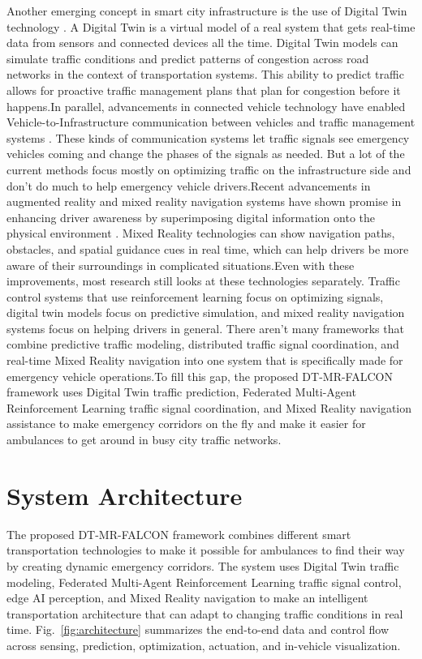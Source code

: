 \documentclass[conference]{IEEEtran}
\begin{document}
Another emerging concept in smart city infrastructure is the use of Digital Twin technology \cite{b13,b14,b15,b16}. A Digital Twin is a virtual model of a real system that gets real-time data from sensors and connected devices all the time. Digital Twin models can simulate traffic conditions and predict patterns of congestion across road networks in the context of transportation systems. This ability to predict traffic allows for proactive traffic management plans that plan for congestion before it happens.In parallel, advancements in connected vehicle technology have enabled Vehicle-to-Infrastructure communication between vehicles and traffic management systems \cite{b25,b26}. These kinds of communication systems let traffic signals see emergency vehicles coming and change the phases of the signals as needed. But a lot of the current methods focus mostly on optimizing traffic on the infrastructure side and don't do much to help emergency vehicle drivers.Recent advancements in augmented reality and mixed reality navigation systems have shown promise in enhancing driver awareness by superimposing digital information onto the physical environment \cite{b27,b28}. Mixed Reality technologies can show navigation paths, obstacles, and spatial guidance cues in real time, which can help drivers be more aware of their surroundings in complicated situations.Even with these improvements, most research still looks at these technologies separately. Traffic control systems that use reinforcement learning focus on optimizing signals, digital twin models focus on predictive simulation, and mixed reality navigation systems focus on helping drivers in general. There aren't many frameworks that combine predictive traffic modeling, distributed traffic signal coordination, and real-time Mixed Reality navigation into one system that is specifically made for emergency vehicle operations.To fill this gap, the proposed DT-MR-FALCON framework uses Digital Twin traffic prediction, Federated Multi-Agent Reinforcement Learning traffic signal coordination, and Mixed Reality navigation assistance to make emergency corridors on the fly and make it easier for ambulances to get around in busy city traffic networks.

\section{System Architecture}
The proposed DT-MR-FALCON framework combines different smart transportation technologies to make it possible for ambulances to find their way by creating dynamic emergency corridors. The system uses Digital Twin traffic modeling, Federated Multi-Agent Reinforcement Learning traffic signal control, edge AI perception, and Mixed Reality navigation to make an intelligent transportation architecture that can adapt to changing traffic conditions in real time. Fig.~\ref{fig:architecture} summarizes the end-to-end data and control flow across sensing, prediction, optimization, actuation, and in-vehicle visualization.
\end{document}
